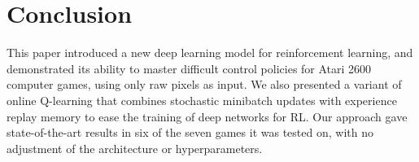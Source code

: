 \documentclass{article} %
\begin{document}
\section{Conclusion}
\vspace{-0.2cm}
\label{sec:conclusion}
This paper introduced a new deep learning model for reinforcement learning, and demonstrated its ability to master difficult control policies for Atari 2600 computer games, using only raw pixels as input.
We also presented a variant of online Q-learning that combines stochastic minibatch updates with experience replay memory to ease the training of deep networks for RL.
Our approach gave state-of-the-art results in six of the seven games it was tested on, with no adjustment of the architecture or hyperparameters.

% 
% 
% 
% 







\end{document}
